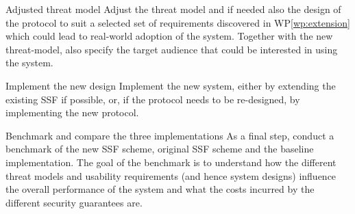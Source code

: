 \documentclass[E]{BAMASA}
\begin{document}
\begin{workpackage}{Adjusted threat model}\label{wp:adjusted-thread-model}
    Adjust the threat model and if needed also the design of the protocol to suit a selected set of requirements discovered in WP\ref{wp:extension} which could lead to real-world adoption of the system.
    Together with the new threat-model, also specify the target audience that could be interested in using the system.  
\end{workpackage}

\begin{workpackage}{Implement the new design}\label{wp:new-design}
    Implement the new system, either by extending the existing SSF if possible, or, if the protocol needs to be re-designed, by implementing the new protocol.
\end{workpackage}

\begin{workpackage}{Benchmark and compare the three implementations}\label{wp:new-implementation}
    As a final step, conduct a benchmark of the new SSF scheme, original SSF scheme and the baseline implementation.
    The goal of the benchmark is to understand how the different threat models and usability requirements (and hence system designs) influence the overall performance of the system and what the costs incurred by the different security guarantees are.
\end{workpackage}


\gradingMA





\end{document}
